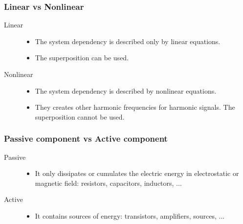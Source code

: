 \documentclass{beamer}
\begin{document}
	\begin{frame}
    \frametitle{Linear vs Nonlinear}
		\begin{description}
			\item[Linear] 
				\begin{itemize}
					\item The system dependency is described only by linear equations.
					\item The superposition can be used.
				\end{itemize}
			\item[Nonlinear] 
				\begin{itemize}
					\item The system dependency is described by nonlinear equations.
					\item They creates other harmonic frequencies for harmonic signals. The superposition cannot be used.
				\end{itemize}
		\end{description}
  \end{frame}
	\begin{frame}
    \frametitle{Passive component vs Active component}
		\begin{description}
			\item[Passive]
				\begin{itemize}
					\item It only dissipates or cumulates the electric energy in electrostatic or magnetic field: resistors, capacitors, inductors, ...
				\end{itemize}
			\item[Active] 
				\begin{itemize}
					\item It contains sources of energy: transistors, amplifiers, sources, ...
				\end{itemize}
		\end{description}
  \end{frame}
\end{document}
